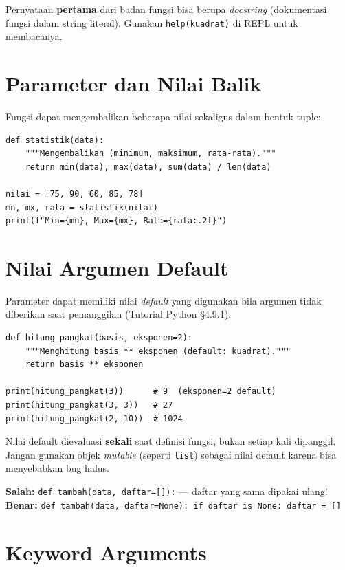 ﻿\documentclass[../main.tex]{subfiles}
\begin{document}
Pernyataan \textbf{pertama} dari badan fungsi bisa berupa \textit{docstring} (dokumentasi fungsi dalam string literal). Gunakan \texttt{help(kuadrat)} di REPL untuk membacanya.

\section{Parameter dan Nilai Balik}

Fungsi dapat mengembalikan beberapa nilai sekaligus dalam bentuk tuple:

\begin{lstlisting}[caption=Nilai balik berganda]
def statistik(data):
    """Mengembalikan (minimum, maksimum, rata-rata)."""
    return min(data), max(data), sum(data) / len(data)

nilai = [75, 90, 60, 85, 78]
mn, mx, rata = statistik(nilai)
print(f"Min={mn}, Max={mx}, Rata={rata:.2f}")
\end{lstlisting}

\section{Nilai Argumen Default}

Parameter dapat memiliki nilai \textit{default} yang digunakan bila argumen tidak diberikan saat pemanggilan (Tutorial Python §4.9.1):

\begin{lstlisting}[caption=Nilai argumen default]
def hitung_pangkat(basis, eksponen=2):
    """Menghitung basis ** eksponen (default: kuadrat)."""
    return basis ** eksponen

print(hitung_pangkat(3))      # 9  (eksponen=2 default)
print(hitung_pangkat(3, 3))   # 27
print(hitung_pangkat(2, 10))  # 1024
\end{lstlisting}

\begin{catatan}
Nilai default dievaluasi \textbf{sekali} saat definisi fungsi, bukan setiap kali dipanggil. Jangan gunakan objek \textit{mutable} (seperti \texttt{list}) sebagai nilai default karena bisa menyebabkan bug halus.

\textbf{Salah:} \texttt{def tambah(data, daftar=[]):} --- daftar yang sama dipakai ulang!\\
\textbf{Benar:} \texttt{def tambah(data, daftar=None): if daftar is None: daftar = []}
\end{catatan}

\section{Keyword Arguments}
\end{document}
